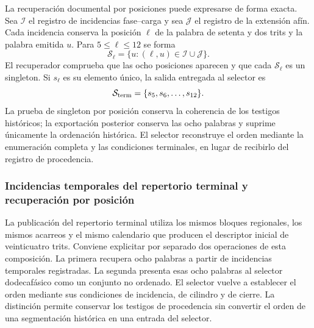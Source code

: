 La recuperación documental por posiciones puede expresarse de forma
exacta. Sea $\mathcal I$ el registro de incidencias fase--carga y sea
$\mathcal J$ el registro de la extensión afín. Cada incidencia conserva
la posición $\ell$ de la palabra de setenta y dos trits y la palabra
emitida $u$. Para $5\leq\ell\leq12$ se forma
\[
 \mathcal S_\ell=
 \{u:(\ell,u)\in\mathcal I\cup\mathcal J\}.
\]
El recuperador comprueba que las ocho posiciones aparecen y que cada
$\mathcal S_\ell$ es un singleton. Si $s_\ell$ es su elemento único,
la salida entregada al selector es
\[
 \mathcal S_{\rm term}=\{s_5,s_6,\ldots,s_{12}\}.
\]
La prueba de singleton por posición conserva la coherencia de los
testigos históricos; la exportación posterior conserva las ocho
palabras y suprime únicamente la ordenación histórica. El selector
reconstruye el orden mediante la enumeración completa y las condiciones
terminales, en lugar de recibirlo del registro de procedencia.

\subsubsection{Incidencias temporales del repertorio terminal y recuperación por posición}
\label{sec:repertorio-incidencias-completas}

La publicación del repertorio terminal utiliza los mismos bloques regionales,
los mismos acarreos y el mismo calendario que producen el descriptor inicial
de veinticuatro trits. Conviene explicitar por separado dos operaciones de
esta composición. La primera recupera ocho palabras a partir de incidencias
temporales registradas. La segunda presenta esas ocho palabras al selector
dodecafásico como un conjunto no ordenado. El selector vuelve a establecer
el orden mediante sus condiciones de incidencia, de cilindro y de cierre.
La distinción permite conservar los testigos de procedencia sin convertir
el orden de una segmentación histórica en una entrada del selector.

